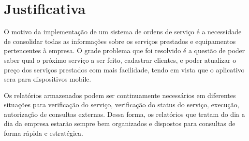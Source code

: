 \chapter{Justificativa}
O motivo da implementação de um sistema de ordens de serviço é a necessidade de consolidar todas as informações sobre os serviços prestados e equipamentos pertencentes à empresa. O grade problema que foi resolvido é a questão de poder saber qual o próximo serviço a ser feito, cadastrar clientes, e poder atualizar o preço dos serviços prestados com mais facilidade, tendo em vista que o aplicativo sera para dispositivos mobile.

Os relatórios armazenados podem ser continuamente necessários em diferentes situações para verificação do serviço, verificação do status do serviço, execução, autorização de consultas externas. Dessa forma, os relatórios que tratam do dia a dia da empresa estarão sempre bem organizados e dispostos para consultas de forma rápida e estratégica.
